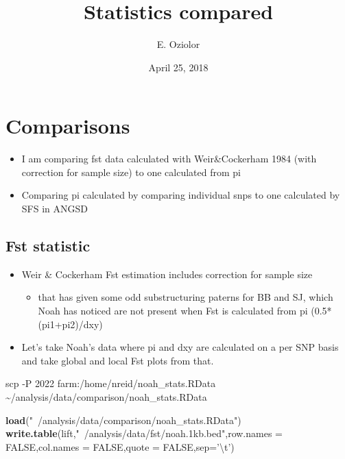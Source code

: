 \documentclass[]{article}
\title{Statistics compared}
\author{E. Oziolor}
\date{April 25, 2018}
\newenvironment{Shaded}{\begin{snugshade}}{\end{snugshade}}
\newcommand{\KeywordTok}[1]{\textcolor[rgb]{0.13,0.29,0.53}{\textbf{#1}}}
\newcommand{\DataTypeTok}[1]{\textcolor[rgb]{0.13,0.29,0.53}{#1}}
\newcommand{\CharTok}[1]{\textcolor[rgb]{0.31,0.60,0.02}{#1}}
\newcommand{\StringTok}[1]{\textcolor[rgb]{0.31,0.60,0.02}{#1}}
\newcommand{\OtherTok}[1]{\textcolor[rgb]{0.56,0.35,0.01}{#1}}
\newcommand{\NormalTok}[1]{#1}
\providecommand{\tightlist}{%
  \setlength{\itemsep}{0pt}\setlength{\parskip}{0pt}}
\begin{document}
\maketitle

\section{Comparisons}\label{comparisons}

\begin{itemize}
\tightlist
\item
  I am comparing fst data calculated with Weir\&Cockerham 1984 (with
  correction for sample size) to one calculated from pi
\item
  Comparing pi calculated by comparing individual snps to one calculated
  by SFS in ANGSD
\end{itemize}

\subsection{Fst statistic}\label{fst-statistic}

\begin{itemize}
\tightlist
\item
  Weir \& Cockerham Fst estimation includes correction for sample size

  \begin{itemize}
  \tightlist
  \item
    that has given some odd substructuring paterns for BB and SJ, which
    Noah has noticed are not present when Fst is calculated from pi
    (0.5*(pi1+pi2)/dxy)
  \end{itemize}
\item
  Let's take Noah's data where pi and dxy are calculated on a per SNP
  basis and take global and local Fst plots from that.
\end{itemize}

scp -P 2022 farm:/home/nreid/noah\_stats.RData
\textasciitilde{}/analysis/data/comparison/noah\_stats.RData

\begin{Shaded}
\begin{Highlighting}[]
\KeywordTok{load}\NormalTok{(}\StringTok{"~/analysis/data/comparison/noah_stats.RData"}\NormalTok{)}
\KeywordTok{write.table}\NormalTok{(lift,}\StringTok{"~/analysis/data/fst/noah.1kb.bed"}\NormalTok{,}\DataTypeTok{row.names =} \OtherTok{FALSE}\NormalTok{,}\DataTypeTok{col.names =} \OtherTok{FALSE}\NormalTok{,}\DataTypeTok{quote =} \OtherTok{FALSE}\NormalTok{,}\DataTypeTok{sep=}\StringTok{'}\CharTok{\textbackslash{}t}\StringTok{'}\NormalTok{)}
\end{Highlighting}
\end{Shaded}
\end{document}
